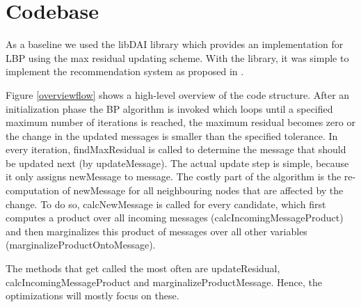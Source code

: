 \section{Codebase}\label{sec:code}
As a baseline we used the libDAI library \cite{Mooij_libDAI_10} which provides an implementation for LBP using the max residual updating scheme. With the library, it was simple to implement the recommendation system as proposed in  \cite{Ha:2012:TRT:2396761.2398636}.

Figure \ref{overviewflow} shows a high-level overview of the code structure. After an initialization phase the BP algorithm is invoked which loops until a specified maximum number of iterations is reached, the maximum residual becomes zero or the change in the updated messages is smaller than the specified tolerance. In every iteration, findMaxResidual is called to determine the message that should be updated next (by updateMessage). The actual update step is simple, because it only assigns newMessage to message. The costly part of the algorithm is the re-computation of newMessage for all neighbouring nodes that are affected by the change. To do so, calcNewMessage is called for every candidate, which first computes a product over all incoming messages (calcIncomingMessageProduct) and then marginalizes this product of messages over all other variables (marginalizeProductOntoMessage). 


The methods that get called the most often are updateResidual, calcIncomingMessageProduct and marginalizeProductMessage. Hence, the optimizations will mostly focus on these.

